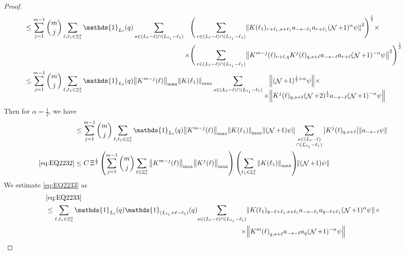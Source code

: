\documentclass[sn-mathphys, Numbered ,a4paper]{sn-jnl}%
\DeclareMathOperator{\Z}{\mathbb{Z}}
\DeclareMathOperator{\NN}{\mathcal{N}}
\newcommand{\half}{\frac{1}{2}}
\theoremstyle{plain}
\theoremstyle{definition}
\theoremstyle{remark}
\theoremstyle{plain}
\theoremstyle{definition}
\theoremstyle{remark}
\begin{document}
\begin{proof}
\begin{align}
		&\leq \sum\limits_{j=1}^{m-1} {{m}\choose j} \sum\limits_{\ell, \ell_1\in \Z^3_*} \mathds{1}_{L_{\ell}}(q) \sum\limits_{s\in(L_{\ell}-\ell) \cap (L_{\ell_1}-\ell_1)}   \begin{aligned}[t] \Bigg(\sum\limits_{ r \in (L_{\ell}-\ell) \cap (L_{\ell_1}-\ell_1)}&\norm{ K(\ell_1)_{r+\ell_1,s+\ell_1}a_{-s-\ell_1} a_{r+\ell_1} (\NN+1)^{\alpha}\psi}^2\Bigg)^\half\nonumber \times \\ \times\Bigg(  \sum\limits_{ r \in (L_{\ell}-\ell) \cap (L_{\ell_1}-\ell_1)}&\norm{ K^{m-j}(\ell)_{r+\ell,q} K^{j}(\ell)_{q,s+\ell} a_{-s-\ell}a_{r+\ell} (\NN+1)^{-\alpha} \psi }^2\Bigg)^\half\end{aligned} \nonumber\\
		&\leq \sum\limits_{j=1}^{m-1} {{m}\choose j} \sum\limits_{\ell, \ell_1\in \Z^3_*} \mathds{1}_{L_{\ell}}(q) \norm{K^{m-j}(\ell)}_{\mathrm{max}} \norm{ K(\ell_1)}_{\mathrm{max}} \sum\limits_{s\in(L_{\ell}-\ell) \cap (L_{\ell_1}-\ell_1)} \begin{aligned}[t] &\norm{ (\NN+1)^{\half+\alpha}\psi}\nonumber \times \\ \times&\norm{  K^{j}(\ell)_{q,s+\ell} (\NN+2)^\half a_{-s-\ell} (\NN+1)^{-\alpha} \psi }\end{aligned} \nonumber
	\end{align} 
	Then for $\alpha = \half$, we have
	\begin{align}
		&\leq \sum\limits_{j=1}^{m-1} {{m}\choose j} \sum\limits_{\ell, \ell_1\in \Z^3_*} \mathds{1}_{L_{\ell}}(q) \norm{K^{m-j}(\ell)}_{\mathrm{max}} \norm{ K(\ell_1)}_{\mathrm{max}} \norm{(\NN+1)\psi}\sum\limits_{ \substack{s \in (L_{\ell}-\ell) \\ \cap (L_{\ell_1}-\ell_1)}} \abs{K^{j}(\ell)_{q,s+\ell}} \norm{ a_{-s-\ell}  \psi }\nonumber\\
		\eqref{eq:EQ2232} &\leq  C \, \Xi^\half \left(  \sum\limits_{j=1}^{m-1} {{m}\choose j} \sum\limits_{\ell \in \Z^3_*} \norm{K^{m-j}(\ell)}_{\mathrm{max}} \norm{ K^{j}(\ell)}_{\mathrm{max}}\right) \left( \sum\limits_{ \ell_1\in \Z^3_*}\norm{ K(\ell_1) }_{\mathrm{max}} \right)\!\! \norm{(\NN+1) \psi }\label{eq:estEQ2232}
	\end{align}
	We estimate \eqref{eq:EQ2233} as
	\begin{align}
		&\eqref{eq:EQ2233}\nonumber\\
		&\leq \sum\limits_{\ell, \ell_1\in \Z^3_*} \mathds{1}_{L_{\ell}}(q) \mathds{1}_{(L_{\ell_1}+\ell-\ell_1)}(q) \begin{aligned}[t]\sum\limits_{ s \in (L_{\ell}-\ell) \cap (L_{\ell_1}-\ell_1)}  &\norm{K(\ell_1)_{q-\ell+\ell_1,s+\ell_1} a_{-s-\ell_1} a_{q-\ell+\ell_1}  (\NN+1)^{\alpha}\psi} \times\nonumber\\\times &\norm{ K^m{(\ell)}_{q,s+\ell}  a_{-s-\ell} a_{q} (\NN+1)^{-\alpha} \psi } \end{aligned}\nonumber\\

\end{align}
\end{proof}
\end{document}
